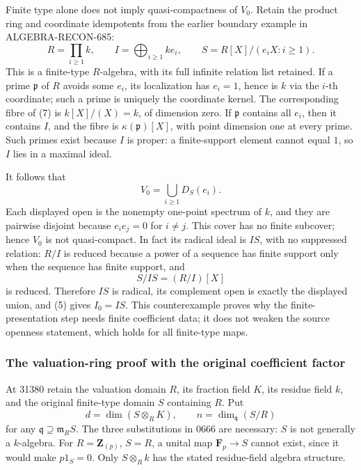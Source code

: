 Finite type alone does not imply quasi-compactness of \(V_0\). Retain the product ring and coordinate idempotents from the earlier boundary example in ALGEBRA-RECON-685: \[
 R=\prod_{i\geq1}k,\qquad
 I=\bigoplus_{i\geq1}k e_i,\qquad
 S=R[X]/(e_iX:i\geq1).
 \tag{7}
\] This is a finite-type \(R\)-algebra, with its full infinite relation list retained. If a prime \(\mathfrak p\) of \(R\) avoids some \(e_i\), its localization has \(e_i=1\), hence is \(k\) via the \(i\)-th coordinate; such a prime is uniquely the coordinate kernel. The corresponding fibre of (7) is \(k[X]/(X)=k\), of dimension zero. If \(\mathfrak p\) contains all \(e_i\), then it contains \(I\), and the fibre is \(\kappa(\mathfrak p)[X]\), with point dimension one at every prime. Such primes exist because \(I\) is proper: a finite-support element cannot equal \(1\), so \(I\) lies in a maximal ideal.

It follows that \[
 V_0=\bigcup_{i\geq1}D_S(e_i).
\] Each displayed open is the nonempty one-point spectrum of \(k\), and they are pairwise disjoint because \(e_ie_j=0\) for \(i\ne j\). This cover has no finite subcover; hence \(V_0\) is not quasi-compact. In fact its radical ideal is \(IS\), with no suppressed relation: \(R/I\) is reduced because a power of a sequence has finite support only when the sequence has finite support, and \[
 S/IS=(R/I)[X]
\] is reduced. Therefore \(IS\) is radical, its complement open is exactly the displayed union, and (5) gives \(I_0=IS\). This counterexample proves why the finite-presentation step needs finite coefficient data; it does not weaken the source openness statement, which holds for all finite-type maps.

\subsubsection{The valuation-ring proof with the original coefficient factor}\label{algebra-proof-034-the-valuation-ring-proof-with-the-original-coefficient-factor}

At 31380 retain the valuation domain \(R\), its fraction field \(K\), its residue field \(k\), and the original finite-type domain \(S\) containing \(R\). Put \[
 d=\dim(S\otimes_R K),\qquad
 n=\dim_{\mathfrak q}(S/R)
\] for any \(\mathfrak q\supseteq\mathfrak m_R S\). The three substitutions in 0666 are necessary: \(S\) is not generally a \(k\)-algebra. For \(R=\mathbf Z_{(p)}\), \(S=R\), a unital map \(\mathbf F_p\to S\) cannot exist, since it would make \(p1_S=0\). Only \(S\otimes_R k\) has the stated residue-field algebra structure.

